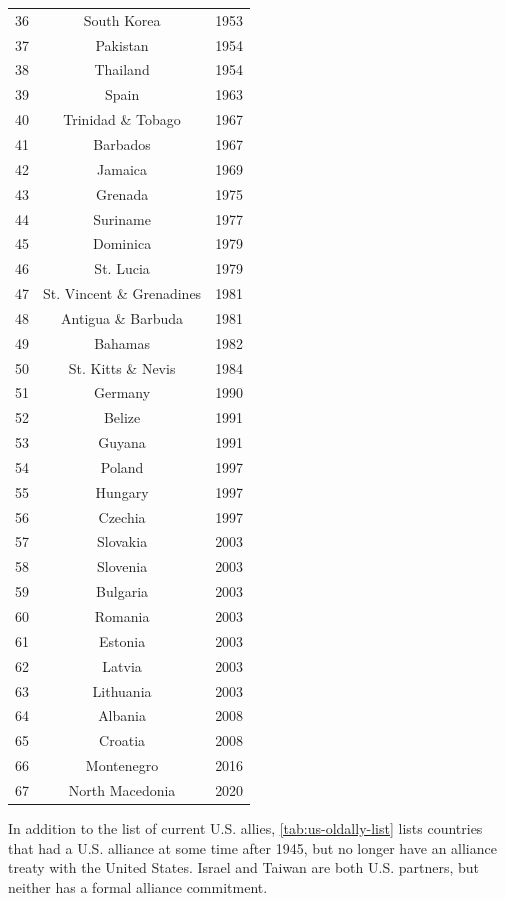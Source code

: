 \documentclass[12pt]{article}
\begin{document}
\begin{longtable}[!htbp]{| c | c | c |}
  36 & South Korea & 1953 \\ 
  37 & Pakistan & 1954 \\ 
  38 & Thailand & 1954 \\ 
  39 & Spain & 1963 \\ 
  40 & Trinidad \& Tobago & 1967 \\ 
  41 & Barbados & 1967 \\ 
  42 & Jamaica & 1969 \\ 
  43 & Grenada & 1975 \\ 
  44 & Suriname & 1977 \\ 
  45 & Dominica & 1979 \\ 
  46 & St. Lucia & 1979 \\ 
  47 & St. Vincent \& Grenadines & 1981 \\ 
  48 & Antigua \& Barbuda & 1981 \\ 
  49 & Bahamas & 1982 \\ 
  50 & St. Kitts \& Nevis & 1984 \\ 
  51 & Germany & 1990 \\ 
  52 & Belize & 1991 \\ 
  53 & Guyana & 1991 \\ 
  54 & Poland & 1997 \\ 
  55 & Hungary & 1997 \\ 
  56 & Czechia & 1997 \\ 
  57 & Slovakia & 2003 \\ 
  58 & Slovenia & 2003 \\ 
  59 & Bulgaria & 2003 \\ 
  60 & Romania & 2003 \\ 
  61 & Estonia & 2003 \\ 
  62 & Latvia & 2003 \\ 
  63 & Lithuania & 2003 \\ 
  64 & Albania & 2008 \\ 
  65 & Croatia & 2008 \\ 
  66 & Montenegro & 2016 \\ 
  67 & North Macedonia & 2020 \\ 
   \hline
\end{longtable}


In addition to the list of current U.S. allies, \autoref{tab:us-oldally-list} lists countries that had a U.S. alliance at some time after 1945, but no longer have an alliance treaty with the United States. 
Israel and Taiwan are both U.S. partners, but neither has a formal alliance commitment. 
\end{document}
